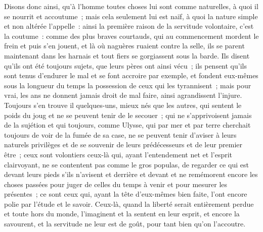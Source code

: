 \documentclass[french,twoside]{book} %
\begin{document}
Disons donc ainsi, qu’à l’homme toutes choses lui sont comme naturelles, à quoi il se nourrit et accoutume ; mais cela seulement lui est naïf, à quoi la nature simple et non altérée l’appelle : ainsi la première raison de la servitude volontaire, c’est la coutume : comme des plus braves courtauds, qui au commencement mordent le frein et puis s’en jouent, et là où naguères ruaient contre la selle, ils se parent maintenant dans les harnais et tout fiers se gorgiassent sous la barde. Ils disent qu’ils ont été toujours sujets, que leurs pères ont ainsi vécu ; ils pensent qu’ils sont tenus d’endurer le mal et se font accroire par exemple, et fondent eux-mêmes sous la longueur du temps la possession de ceux qui les tyrannisent ; mais pour vrai, les ans ne donnent jamais droit de mal faire, ainsi agrandissent l’injure. Toujours s’en trouve il quelques-uns, mieux nés que les autres, qui sentent le poids du joug et ne se peuvent tenir de le secouer ; qui ne s’apprivoisent jamais de la sujétion et qui toujours, comme Ulysse, qui par mer et par terre cherchait toujours de voir de la fumée de sa case, ne se peuvent tenir d’aviser à leurs naturels privilèges et de se souvenir de leurs prédécesseurs et de leur premier être ; ceux sont volontiers ceux-là qui, ayant l’entendement net et l’esprit clairvoyant, ne se contentent pas comme le gros populas, de regarder ce qui est devant leurs pieds s’ils n’avisent et derrière et devant et ne remémorent encore les choses passées pour juger de celles du temps à venir et pour mesurer les présentes ; ce sont ceux qui, ayant la tête d’eux-mêmes bien faite, l’ont encore polie par l’étude et le savoir. Ceux-là, quand la liberté serait entièrement perdue et toute hors du monde, l’imaginent et la sentent en leur esprit, et encore la savourent, et la servitude ne leur est de goût, pour tant bien qu’on l’accoutre.\par
\end{document}
